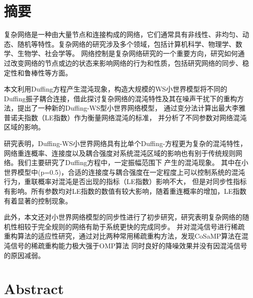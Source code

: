 \maketitle%
\MAKETITLE%

\intobmk\chapter*{摘\quad 要}%
\setcounter{page}{1}%
复杂网络是一种由大量节点和连接构成的网络，它们通常具有非线性、非均匀、动态、随机等特性。复杂网络的研究涉及多个领域，包括计算机科学、物理学、数学、生物学、社会学等。
网络控制是复杂网络研究的一个重要方向，研究如何通过改变网络的节点或边的状态来影响网络的行为和性质，包括研究网络的同步、稳定性和鲁棒性等方面。\par
本文利用Duffing方程产生混沌现象，构造大规模的WS小世界模型将不同的Duffing振子耦合连接，借此探讨复杂网络的混沌特性及其在噪声干扰下的重构方法，提出了一种新的Duffing-WS型小世界网络模型，
通过变分法计算出最大李雅普诺夫指数（LE指数）作为衡量网络混沌的标准，
并分析了不同参数对网络混沌区域的影响。\par
研究表明，Duffing-WS小世界网络具有比单个Duffing-方程更为复杂的混沌特性，
网络重连概率、连接度以及耦合强度对系统混沌区域的影响也有别于传统规则网络。我们主要研究了Duffing方程中，一定振幅范围下
产生的混沌现象。
其中在小世界模型中(p=0.5)，合适的连接度与耦合强度在一定程度上可以控制系统的混沌行为，重联概率对混沌是否出现的指标（LE指数）影响不大，
但是对同步性指标有影响。所有参数均对LE指数的数值有较大影响，随着重连概率的增加，LE指数有着显著的控制现象。\par
此外，本文还对小世界网络模型的同步性进行了初步研究，研究表明复杂网络的随机性相较于完全规则的网络有助于系统更快的完成同步。
并对混沌信号进行稀疏重构算法的适应性研究，通过对比两种常用稀疏重构方法，发现CoSaMP算法在混沌信号的稀疏重构能力极大强于OMP算法
同时良好的降噪效果并没有因混沌信号的原因减弱。
\par {}%
\intobmk\chapter*{Abstract}%


